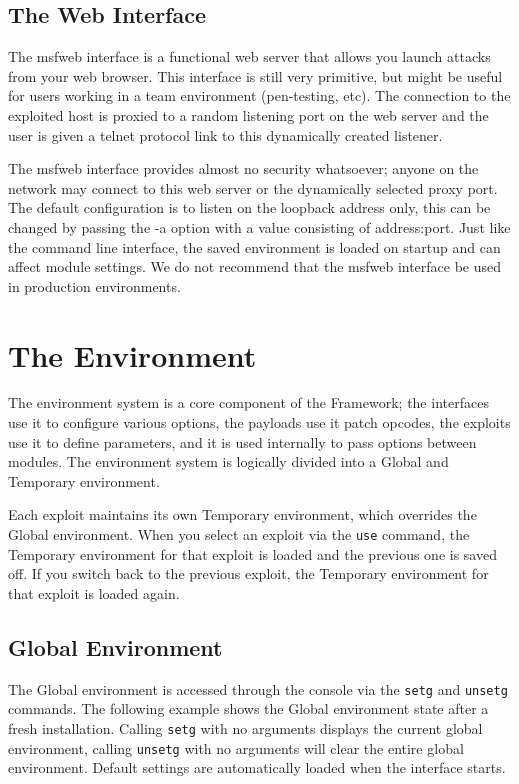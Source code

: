 \documentclass{report}
\begin{document}
    \section{The Web Interface}
    \label{STARTED-WEB}
\par
The msfweb interface is a functional web server that allows you launch attacks
from your web browser. This interface is still very primitive, but might be
useful for users working in a team environment (pen-testing, etc). The
connection to the exploited host is proxied to a random listening port on the
web server and the user is given a telnet protocol link to this dynamically
created listener.

\par
The msfweb interface provides almost no security whatsoever; anyone on the
network may connect to this web server or the dynamically selected proxy port.
The default configuration is to listen on the loopback address only, this can be
changed by passing the -a option with a value consisting of address:port. Just
like the command line interface, the saved environment is loaded on startup and
can affect module settings. We do not recommend that the msfweb interface be
used in production environments. 

\pagebreak



\chapter{The Environment}

\par
The environment system is a core component of the Framework; the interfaces use
it to configure various options, the payloads use it patch opcodes, the exploits
use it to define parameters, and it is used internally to pass options between
modules. The environment system is logically divided into a Global and Temporary environment.  

\par
Each exploit maintains its own Temporary environment, which overrides the Global
environment. When you select an exploit via the \texttt{use} command, the
Temporary environment for that exploit is loaded and the previous one is saved
off. If you switch back to the previous exploit, the Temporary environment for
that exploit is loaded again.   

    \section{Global Environment}
    \label{ENV-GLOBAL}
\par
The Global environment is accessed through the console via the \texttt{setg} and
\texttt{unsetg} commands. The following example shows the Global environment
state after a fresh installation. Calling \texttt{setg} with no arguments
displays the current global environment, calling \texttt{unsetg} with no
arguments will clear the entire global environment. Default settings are
automatically loaded when the interface starts.
\end{document}
